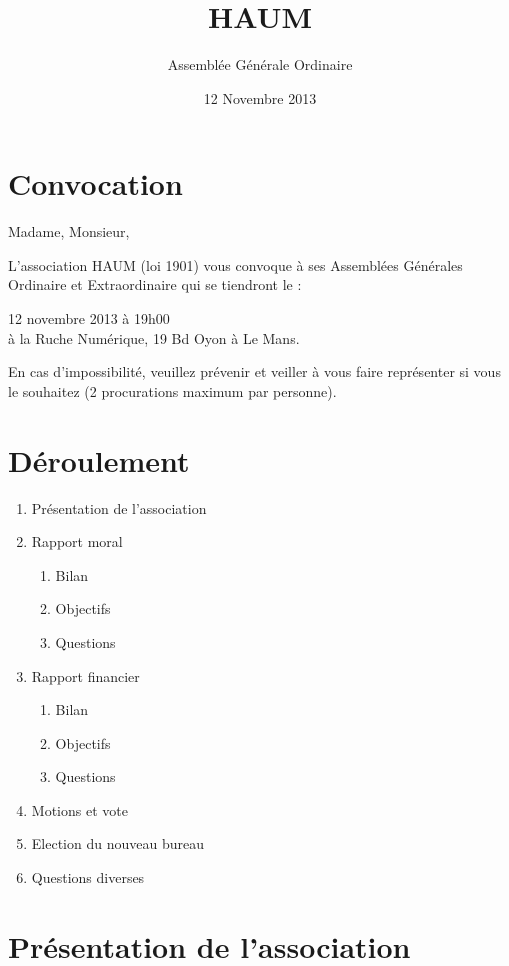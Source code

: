 \documentclass[11pt]{article}
\title{HAUM}
\author{Assemblée Générale Ordinaire}
\date{12 Novembre 2013}
\begin{document}
\maketitle


\section*{Convocation}

Madame, Monsieur, 

L'association HAUM (loi 1901) vous convoque à ses Assemblées Générales Ordinaire et Extraordinaire qui se tiendront le :

\begin{center}
{\Large 12 novembre 2013 à 19h00}\\
à la Ruche Numérique, 19 Bd Oyon à Le Mans.
\end{center}

En cas d'impossibilité, veuillez prévenir et veiller à vous faire représenter si vous le souhaitez (2 procurations maximum par personne).

\section*{Déroulement}

\begin{enumerate}
    \item Présentation de l'association
    \item Rapport moral
        \begin{enumerate}
            \item Bilan
            \item Objectifs
            \item Questions
        \end{enumerate}
    \item Rapport financier
        \begin{enumerate}
            \item Bilan
            \item Objectifs
            \item Questions
        \end{enumerate}
    \item Motions et vote
    \item Election du nouveau bureau
    \item Questions diverses
\end{enumerate}

\section{Présentation de l'association}
\end{document}
